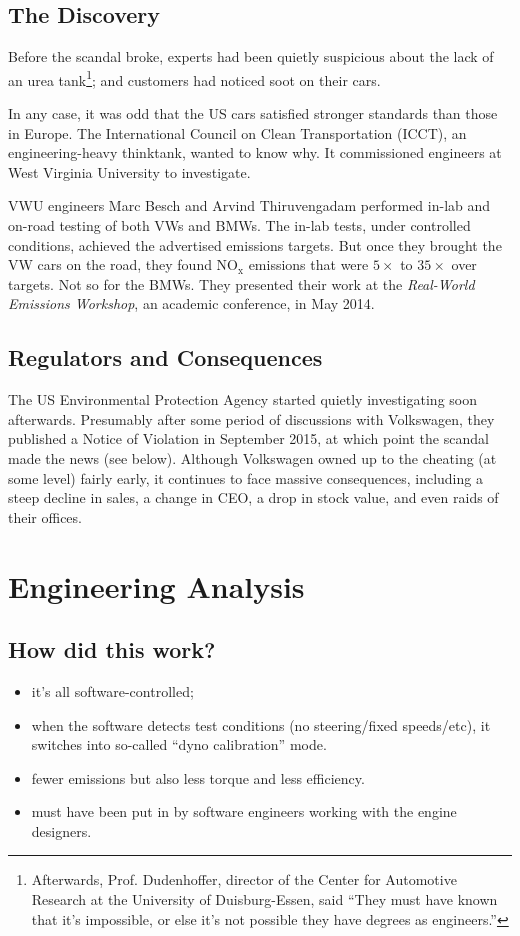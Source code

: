 \documentclass[11pt]{article}
\begin{document}
\subsection*{The Discovery}
Before the scandal broke, experts had been quietly suspicious about
the lack of an urea tank\footnote{Afterwards, Prof. Dudenhoffer, director of the Center for Automotive Research at the University of Duisburg-Essen, said ``They must have known that it's impossible, or else it's not possible they have degrees as engineers.''}; and customers had noticed soot on their
cars. 

In any case, it was odd that the US cars satisfied stronger standards
than those in Europe. The International Council on Clean
Transportation (ICCT), an engineering-heavy thinktank, wanted to know
why. It commissioned engineers at West Virginia University to
investigate.

VWU engineers Marc Besch and Arvind Thiruvengadam performed in-lab and
on-road testing of both VWs and BMWs. The in-lab tests, under
controlled conditions, achieved the advertised emissions targets. But once
they brought the VW cars on the road, they found NO$_\mathrm{x}$ emissions
that were $5\times$ to $35\times$ over targets. Not so for the BMWs. They presented
their work at the \emph{Real-World Emissions Workshop}, an academic conference,
in May 2014.

\subsection*{Regulators and Consequences}

The US Environmental Protection Agency started quietly investigating
soon afterwards.  Presumably after some period of discussions with
Volkswagen, they published a Notice of Violation in September 2015, at
which point the scandal made the news (see below). Although Volkswagen
owned up to the cheating (at some level) fairly early, it
continues to face massive consequences, including a steep decline in
sales, a change in CEO, a drop in stock value, and even raids of their
offices.

\section*{Engineering Analysis}

\subsection*{How did this work?}
\begin{itemize}[noitemsep]
\item it's all software-controlled;
\item when the software detects test conditions (no steering/fixed speeds/etc), it switches into so-called ``dyno calibration'' mode.
\item fewer emissions but also less torque and less efficiency.
\item must have been put in by software engineers working with the engine designers.
\end{itemize}
\end{document}
